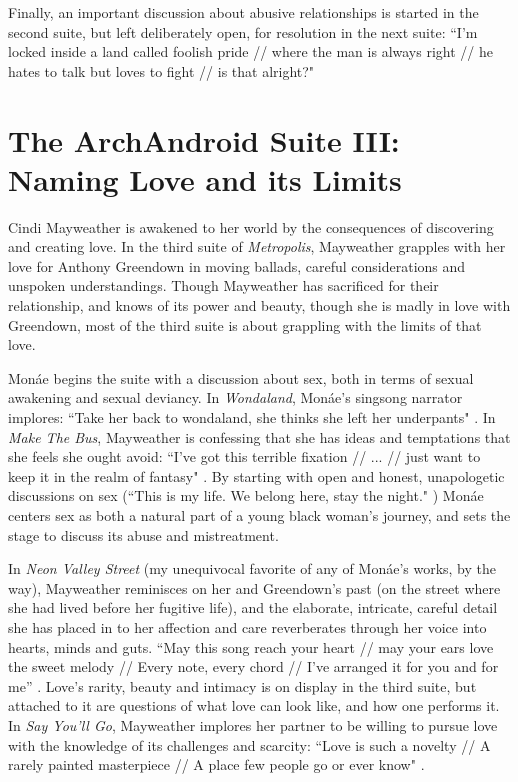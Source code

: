 \documentclass[a4paper, 11pt]{article} %
\begin{document}
Finally, an important discussion about abusive relationships is started in the second suite, but left deliberately open, for resolution in the next suite:
``I'm locked inside a land called foolish pride // where the man is always right // he hates to talk but loves to fight // is that alright?" \cite{lockedinside}


\section*{The ArchAndroid Suite III: Naming Love and its Limits}

Cindi Mayweather is awakened to her world by the consequences of discovering and creating love.
In the third suite of \emph{Metropolis}, Mayweather grapples with her love for Anthony Greendown in moving ballads, careful considerations and unspoken understandings.
Though Mayweather has sacrificed for their relationship, and knows of its power and beauty, though she is madly in love with Greendown, most of the third suite is about grappling with the limits of that love. 

Mon\'ae begins the suite with a discussion about sex, both in terms of sexual awakening and sexual deviancy.
In \emph{Wondaland}, Mon\'ae's singsong narrator implores: ``Take her back to wondaland, she thinks she left her underpants" \cite{wondaland}.
In \emph{Make The Bus}, Mayweather is confessing that she has ideas and temptations that she feels she ought avoid:
``I've got this terrible fixation // ... // just want to keep it in the realm of fantasy" \cite{makethebus}.
By starting with open and honest, unapologetic discussions on sex (``This is my life. We belong here, stay the night." \cite{wondaland}) Mon\'ae centers sex as both a natural part of a young black woman's journey, and sets the stage to discuss its abuse and mistreatment.

In \emph{Neon Valley Street} (my unequivocal favorite of any of Mon\'ae's works, by the way), Mayweather reminisces on her and Greendown's past (on the street where she had lived before her fugitive life), and the elaborate, intricate, careful detail she has placed in to her affection and care reverberates through her voice into hearts, minds and guts.
``May this song reach your heart // may your ears love the sweet melody // Every note, every chord // I've arranged it for you and for me'' \cite{neonvalleystreet}.
Love's rarity, beauty and intimacy is on display in the third suite, but attached to it are questions of what love can look like, and how one performs it.
In \emph{Say You'll Go}, Mayweather implores her partner to be willing to pursue love with the knowledge of its challenges and scarcity:
``Love is such a novelty // A rarely painted masterpiece // A place few people go or ever know" \cite{sayyouwillgo}.
\end{document}
